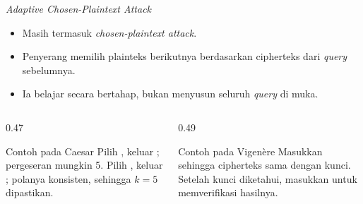 \documentclass[aspectratio=169,11pt]{beamer}
\begin{document}
\begin{frame}{\textit{Adaptive Chosen-Plaintext Attack}}
    \begin{itemize}
        \item Masih termasuk \textit{chosen-plaintext attack}.
        \item Penyerang memilih plainteks berikutnya berdasarkan cipherteks
              dari \textit{query} sebelumnya.
        \item Ia belajar secara bertahap, bukan menyusun seluruh
              \textit{query} di muka.
    \end{itemize}
    \vspace{0.15cm}
    \begin{columns}[T,onlytextwidth]
        \begin{column}{0.47\textwidth}
            \begin{block}{Contoh pada Caesar}
                \footnotesize
                Pilih , keluar ; pergeseran mungkin 5.
                Pilih , keluar ; polanya konsisten, sehingga
                $k=5$ dipastikan.
            \end{block}
        \end{column}
        \begin{column}{0.49\textwidth}
            \begin{exampleblock}{Contoh pada Vigen\`ere}
                \footnotesize
                Masukkan  sehingga cipherteks sama dengan kunci.
                Setelah kunci diketahui, masukkan  untuk
                memverifikasi hasilnya.
            \end{exampleblock}
        \end{column}
    \end{columns}
\end{frame}
\end{document}
